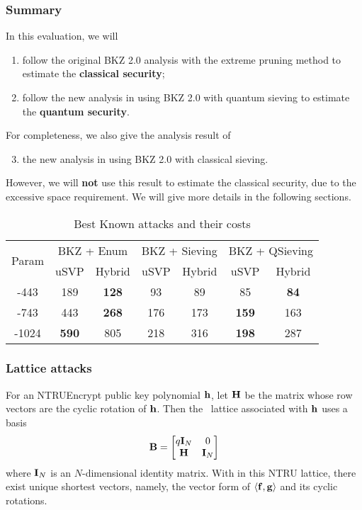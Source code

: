 \documentclass{llncs}
\newcommand{\bff}{{\bf f}}
\newcommand{\bfg}{{\bf g}}
\newcommand{\bfh}{{\bf h}}
\newcommand{\bfB}{{\bf B}}
\newcommand{\bfH}{{\bf H}}
\newcommand{\bfI}{{\bf I}}
\newcommand{\ntru}{{\sf{NTRU}}}
\newcommand{\<}{\langle}
\renewcommand{\>}{\rangle}
\begin{document}
\subsubsection{Summary}
In this evaluation, we will
\begin{enumerate}


\item follow the original BKZ 2.0 analysis \cite{BKZ2} with the extreme pruning method to estimate
the {\bf classical security};
\item follow the new analysis in \cite{newhope} using BKZ 2.0 with quantum sieving to estimate
the {\bf quantum security}.
\end{enumerate}
\noindent
For completeness, we also give the analysis result
of 
\begin{enumerate}
\setcounter{enumi}{2}
\item   the new analysis in \cite{newhope} using BKZ 2.0 with classical sieving.
\end{enumerate}
However, we will {\bf not} use this result to estimate the classical security, due to the excessive
space requirement. We will give more details in
the following sections.


\begin{table}
\centering
\caption{Best Known attacks and their costs}
\label{tbl:rhf}
\begin{tabular}{|c|c|c|c|c|c|c|}\hline
\multirow{2}{*}{Param}  &\multicolumn{2}{|c|}{BKZ + Enum}& \multicolumn{2}{|c|}{BKZ + Sieving}& \multicolumn{2}{|c|}{BKZ + QSieving}\\
\cline{2-7}
 &uSVP & Hybrid&uSVP & Hybrid&uSVP & Hybrid\\\hline\hline
\ntru-443 &189 &{\bf 128} &93&89&85 & {\bf 84}  \\\hline
\ntru-743 & 443& {\bf 268}&176&173&{\bf 159} & 163\\\hline
\ntru-1024  &{\bf 590} &805 &218&316&{\bf 198} & 287 \\\hline

\end{tabular}
\end{table}



\subsubsection{Lattice attacks}\label{ss:latatt}
For an NTRUEncrypt public key polynomial $\bfh$, let $\bfH$ be the matrix whose
row vectors are the cyclic rotation of $\bfh$. Then the \ntru~lattice associated with
$\bfh$ uses a basis
$$\bfB = 
\begin{bmatrix}
q\bfI_N & 0 \\
 \bfH  &\bfI_N
\end{bmatrix}
$$
where $\bfI_N$ is an $N$-dimensional identity matrix.
With in this NTRU lattice, there exist unique shortest vectors, namely,
the vector form of $\left<\bff,\bfg\right>$ and its cyclic rotations.
\end{document}
